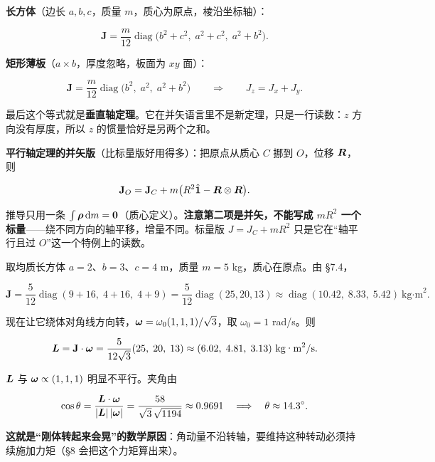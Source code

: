 \documentclass[11pt]{ctexart}
\newcommand{\ten}[1]{\mathbf{#1}}
\newcommand{\unitd}{\hat{\ten{1}}}
\let\origsubhdr\subhdr
\renewcommand{\subhdr}[1]{\par\needspace{3\baselineskip}\origsubhdr{#1}}
\begin{document}
\textbf{长方体}（边长 $a,b,c$，质量 $m$，质心为原点，棱沿坐标轴）：

\[
\ten J=\frac{m}{12}\operatorname{diag}\bigl(b^2+c^2,\;a^2+c^2,\;a^2+b^2\bigr).
\]

\textbf{矩形薄板}（$a\times b$，厚度忽略，板面为 $xy$ 面）：

\[
\ten J=\frac{m}{12}\operatorname{diag}\bigl(b^2,\;a^2,\;a^2+b^2\bigr)
\qquad\Longrightarrow\qquad J_z=J_x+J_y .
\]

最后这个等式就是\textbf{垂直轴定理}。它在并矢语言里不是新定理，只是一行读数：$z$ 方向没有厚度，所以 $z$ 的惯量恰好是另两个之和。

\textbf{平行轴定理的并矢版}（比标量版好用得多）：把原点从质心 $C$ 挪到 $O$，位移 $\boldsymbol{R}$，则

\[
\ten J_O=\ten J_C+m\bigl(R^2\unitd-\vect R\otimes\vect R\bigr).
\]

推导只用一条 $\int\boldsymbol{\rho}\,\mathrm{d} m=\boldsymbol{0}$（质心定义）。\textbf{注意第二项是并矢，不能写成 $mR^2$ 一个标量}——绕不同方向的轴平移，增量不同。标量版 $J=J_C+mR^2$ 只是它在“轴平行且过 $O$”这一个特例上的读数。


取均质长方体 $a=2$、$b=3$、$c=4$ m，质量 $m=5$ kg，质心在原点。由 §7.4，

\[
\ten J=\frac{5}{12}\operatorname{diag}(9+16,\;4+16,\;4+9)=\frac{5}{12}\operatorname{diag}(25,20,13)
\approx\operatorname{diag}(10.42,\;8.33,\;5.42)\ \text{kg·m}^2 .
\]

现在让它绕体对角线方向转，$\boldsymbol{\omega}=\omega_0(1,1,1)/\sqrt3$，取 $\omega_0=1$ rad/s。则

\[
\vect L=\ten J\cdot\vect\omega=\frac{5}{12\sqrt3}(25,\;20,\;13)\approx(6.02,\;4.81,\;3.13)\ \text{kg·m}^2/\text{s}.
\]

$\boldsymbol{L}$ 与 $\boldsymbol{\omega}\propto(1,1,1)$ 明显不平行。夹角由

\[
\cos\theta=\frac{\boldsymbol{L}\cdot\boldsymbol{\omega}}{|\boldsymbol{L}|\,|\boldsymbol{\omega}|}
=\frac{58}{\sqrt3\,\sqrt{1194}}\approx0.9691
\quad\Longrightarrow\quad
\theta\approx14.3^\circ .
\]

\textbf{这就是“刚体转起来会晃”的数学原因}：角动量不沿转轴，要维持这种转动必须持续施加力矩（§8 会把这个力矩算出来）。

\end{document}
